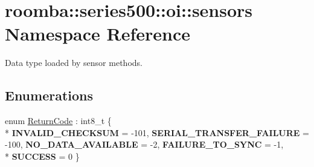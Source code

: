 \hypertarget{namespaceroomba_1_1series500_1_1oi_1_1sensors}{\section{roomba\+:\+:series500\+:\+:oi\+:\+:sensors Namespace Reference}
\label{namespaceroomba_1_1series500_1_1oi_1_1sensors}
}


Data type loaded by sensor methods.  


\subsection*{Enumerations}
\begin{DoxyCompactItemize}
\item 
\hypertarget{namespaceroomba_1_1series500_1_1oi_1_1sensors_afedb9083158162092444b523e0a32ebb}{enum \hyperlink{namespaceroomba_1_1series500_1_1oi_1_1sensors_afedb9083158162092444b523e0a32ebb}{Return\+Code} \+: int8\+\_\+t \{ \\*
{\bfseries I\+N\+V\+A\+L\+I\+D\+\_\+\+C\+H\+E\+C\+K\+S\+U\+M} = -\/101, 
{\bfseries S\+E\+R\+I\+A\+L\+\_\+\+T\+R\+A\+N\+S\+F\+E\+R\+\_\+\+F\+A\+I\+L\+U\+R\+E} = -\/100, 
{\bfseries N\+O\+\_\+\+D\+A\+T\+A\+\_\+\+A\+V\+A\+I\+L\+A\+B\+L\+E} = -\/2, 
{\bfseries F\+A\+I\+L\+U\+R\+E\+\_\+\+T\+O\+\_\+\+S\+Y\+N\+C} = -\/1, 
\\*
{\bfseries S\+U\+C\+C\+E\+S\+S} = 0
 \}}\label{namespaceroomba_1_1series500_1_1oi_1_1sensors_afedb9083158162092444b523e0a32ebb}


\end{DoxyCompactItemize}
